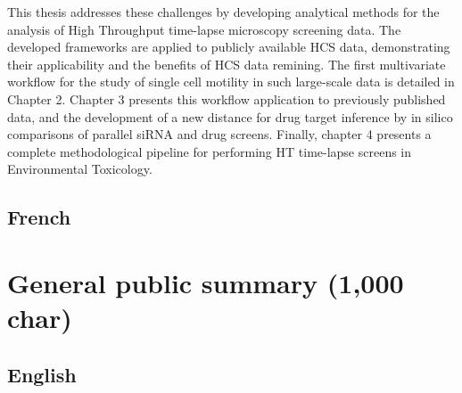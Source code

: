 \documentclass[12pt]{article}
\begin{document}
This thesis addresses these challenges by developing analytical methods for the analysis of High Throughput time-lapse microscopy screening data. The developed frameworks are applied to publicly available HCS data, demonstrating their applicability and the benefits of HCS data remining. %
The first multivariate workflow for the study of single cell motility in such large-scale data is detailed in Chapter 2. Chapter 3 presents this workflow application to previously published data, and the development of a new distance for drug target inference by in silico comparisons of parallel siRNA and drug screens. Finally, chapter 4 presents a complete methodological pipeline for performing HT time-lapse screens in Environmental Toxicology.%




\subsection{French}

\section{General public summary (1,000 char)}
\subsection{English}
%
%
%
\end{document}
